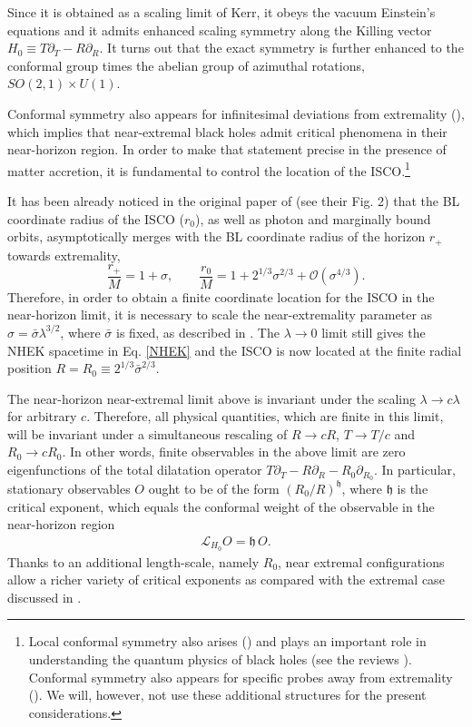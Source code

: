 \documentclass[a4paper,fleqn,usenatbib]{mnrasMOD}
\numberwithin{equation}{section}
\newcommand{\bea}{\begin{eqnarray}}
\newcommand{\eea}{\end{eqnarray}}
\newcommand{\be}{\begin{equation}}
\newcommand{\ee}{\end{equation}}
\def\p{\partial}
\begin{document}
Since it is obtained as a scaling limit of Kerr, it obeys the vacuum Einstein's equations and it admits enhanced scaling symmetry along the Killing vector $H_0 \equiv T \p_T - R \p_R$. It turns out that the exact symmetry is further enhanced to the conformal group times the abelian group of azimuthal rotations, $SO(2,1)\times U(1)$. 

Conformal symmetry also appears for infinitesimal deviations from extremality (\cite{Amsel:2009ev,Bredberg:2009pv}), which implies that near-extremal black holes admit critical phenomena in their near-horizon region.  In order to make that statement precise in the presence of matter accretion, it is fundamental to control the location of the ISCO.\footnote{Local conformal symmetry also arises (\cite{Guica:2008mu}) and plays an important role in understanding the quantum physics of black holes (see the reviews \cite{Bredberg:2011hp,2012arXiv1203.3561C}). Conformal symmetry also appears for specific probes away from extremality (\cite{Castro:2010fd}). We will, however, not use these additional structures for the present considerations.}

It has been already noticed in the original paper of \cite{Bardeen:1972fi} (see their Fig. 2) that the BL coordinate radius of the ISCO ($r_{0}$), as well as photon and marginally bound orbits, asymptotically merges with the BL coordinate radius of the horizon $r_{+}$ towards extremality,
\be
\frac{r_{+}}{M} = 1 + \sigma, \qquad \frac{r_{0}}{M} = 1 + 2^{1/3}\sigma^{2/3}+\mathcal{O}\left(\sigma^{4/3}\right) .
\ee
Therefore, in order to obtain a finite coordinate location for the ISCO in the near-horizon limit, it is necessary to scale the near-extremality parameter as $\sigma = \bar\sigma \lambda^{3/2}$, where $\bar{\sigma}$ is fixed, as described in \cite{Gralla:2015rpa}. The $\lambda \rightarrow 0$ limit still gives the NHEK spacetime in Eq. \eqref{NHEK} and the ISCO is now located at the finite radial position $R=R_{0} \equiv 2^{1/3} \bar{\sigma}^{2/3}$. 

The near-horizon near-extremal limit above is invariant under the scaling $\lambda \rightarrow c \lambda$ for arbitrary $c$. Therefore, all physical quantities, which are finite in this limit, will be invariant under a simultaneous rescaling of $R \rightarrow c R$, $T \rightarrow T/c$ and $R_{0} \rightarrow c R_{0}$. In other words, finite observables in the above limit are zero eigenfunctions of the total dilatation operator $T \p_T - R \p_R - R_{0}\p_{R_{0}}$. In particular, stationary observables $O$ ought to be of the form $\left(R_{0}/R\right)^{{\mathfrak h}}$, where ${\mathfrak h}$ is the critical exponent, which equals the conformal weight of the observable in the near-horizon region
\bea
\mathcal L_{H_0} O = {\mathfrak h}\, O.
\eea 
Thanks to an additional length-scale, namely $R_0$, near extremal configurations allow a richer variety of critical exponents as compared with the extremal case discussed in \cite{Gralla:2016jfc}.
\end{document}
